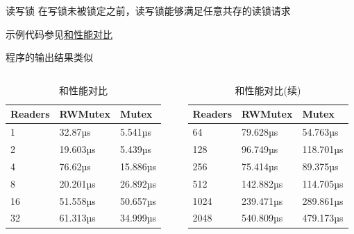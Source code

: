 \iffalse
\begin{frame}{读写锁\RWMutex }
    \alert{在写锁未被锁定之前}，读写锁能够满足任意共存的读锁请求

    示例代码参见\href{https://github.com/sammyne/concurrency-in-go/blob/master/chapter03/sync.pkg/mutex/rwlock.go}{\Mutex 和\RWMutex 性能对比}

    程序的输出结果类似
    \begin{columns}
            \begin{table}
                \centering
                \caption{\Mutex 和\RWMutex 性能对比}
                \begin{tabular}{lll}
                    \hline
                    Readers  &RWMutex       &Mutex  \\
                    \hline
                    1        &32.87µs       &5.541µs \\
                    2        &19.603µs      &5.439µs \\
                    4        &76.62µs       &15.886µs \\
                    8        &20.201µs      &26.892µs \\
                    16       &51.558µs      &50.657µs \\
                    32       &61.313µs      &34.999µs \\
                    \hline
                \end{tabular}
            \end{table}

            \begin{table}
                \centering
                \caption{\Mutex 和\RWMutex 性能对比(续)}
                \begin{tabular}{lll}
                    \hline
                    Readers  &RWMutex       &Mutex  \\
                    \hline
                    64       &79.628µs      &54.763µs \\
                    128      &96.749µs      &118.701µs \\
                    256      &75.414µs      &89.375µs \\
                    512      &142.882µs     &114.705µs \\
                    1024     &239.471µs     &289.861µs \\
                    2048     &540.809µs     &479.173µs \\ 
                    \hline
                \end{tabular}
            \end{table}
    \end{columns}
\end{frame}

